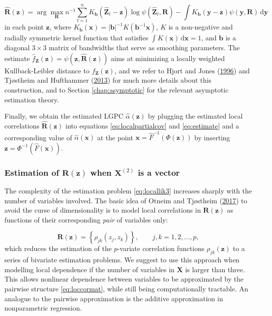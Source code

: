 \documentclass[
  12pt,
  letterpaper]{article}
\newcommand{\X}{\bm{X}}
\newcommand{\Xtwo}{\bm{X}^{(2)}}
\newcommand{\x}{\bm{x}}
\newcommand{\Z}{\bm{Z}}
\newcommand{\z}{\bm{z}}
\newcommand{\hZ}{\widehat{\bm{Z}}}
\newcommand{\y}{\bm{y}}
\newcommand{\R}{\bm{R}}
\newcommand{\hR}{\widehat{\bm{R}}}
\newcommand{\hf}{\widehat{f}}
\newcommand{\hh}{\bm{b}}
\newcommand{\halpha}{\widehat{\alpha}}
\theoremstyle{definition}
\theoremstyle{definition}
\theoremstyle{definition}
\theoremstyle{remark}
\begin{document}
\begin{equation}
\hR(\z) = \arg\max_{\R} n^{-1} \sum_{t=1}^nK_{\hh}(\hZ_t - \z)\log\psi(\hZ_t, \R) - \int K_{\hh}(\y - \z)\psi(\y, \R)\,\textrm{d}\y
\label{eq:locallik3}
\end{equation}
in each point \(\z\), where \(K_{\hh}(\x) = |\hh|^{-1}K(\hh^{-1}\x)\), \(K\) is a non-negative and radially symmetric kernel function that satisfies \(\int K(\x)\,\textrm{d}\x=1\), and \(\hh\) is a diagonal \(3\times3\) matrix of bandwidths that serve as smoothing parameters. The estimate \(\hf_{\Z}(\z) = \psi(\z, \hR(\z))\) aims at minimizing a locally weighted Kullback-Leibler distance to \(f_{\Z}(\z)\), and we refer to Hjort and Jones (\protect\hyperlink{ref-hjort1996locally}{1996}) and Tjøstheim and Hufthammer (\protect\hyperlink{ref-tjostheim2013local}{2013}) for much more details about this construction, and to Section \ref{chap:asymptotic} for the relevant asymptotic estimation theory.

Finally, we obtain the estimated LGPC \(\halpha(\z)\) by plugging the estimated local correlations \(\hR(\z)\) into equations \eqref{eq:localpartialcov} and \eqref{eq:estimate} and a corresponding value of \(\halpha(\x)\) at the point \(\x = \widehat F^{-1}(\Phi(\z))\) by inserting \(\z = \Phi^{-1}({\widehat F(\x)})\).

\hypertarget{chap:bivariate}{%
\subsubsection{\texorpdfstring{Estimation of \(\R(\z)\) when \(\Xtwo\) is a vector}{Estimation of \textbackslash R(\textbackslash z) when \textbackslash Xtwo is a vector}}\label{chap:bivariate}}

The complexity of the estimation problem \eqref{eq:locallik3} increases sharply with the number of variables involved. The basic idea of Otneim and Tjøstheim (\protect\hyperlink{ref-otneim2017locally}{2017}) to avoid the curse of dimensionality is to model local correlations in \(\R(\z)\) as functions of their corresponding \emph{pair} of variables only:

\begin{equation}
\R(\z) = \left\{\rho_{jk}(z_j, z_k)\right\}, \qquad j,k = 1, 2, \ldots, p,
\label{eq:loccormat}
\end{equation}
which reduces the estimation of the \(p\)-variate correlation functions \(\rho_{jk}(\z)\) to a series of bivariate estimation problems. We suggest to use this approach when modelling local dependence if the number of variables in \(\X\) is larger than three. This allows nonlinear dependence between variables to be approximated by the pairwise structure \eqref{eq:loccormat}, while still being computationally tractable. An analogue to the pairwise approximation is the additive approximation in nonparametric regression.
\end{document}
